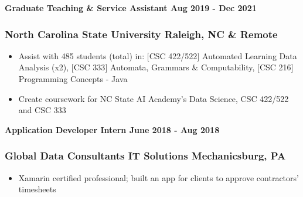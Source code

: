 \vspace{-4pt}

\noindent\textbf{Graduate Teaching \& Service Assistant \hfill Aug 2019 - Dec 2021}
\subsubsection{North Carolina State University \hfill Raleigh, NC \& Remote}
\vspace{-2pt}
\begin{itemize}
\setlength\itemsep{-0.5em}
	\item Assist with 485 students (total) in: {\footnotesize $[$CSC 422/522$]$} Automated Learning Data Analysis (x2), {\footnotesize $[$CSC 333$]$} Automata, Grammars \& Computability, {\footnotesize $[$CSC 216$]$} Programming Concepts - Java
    \item Create coursework for NC State AI Academy's Data Science, CSC 422/522 and CSC 333
\end{itemize}

\vspace{-4pt}

\noindent\textbf{Application Developer Intern \hfill June 2018 - Aug 2018}
\subsubsection{Global Data Consultants IT Solutions \hfill Mechanicsburg, PA}
\vspace{-2pt}
\begin{itemize}
\setlength\itemsep{-0.5em}
	\item Xamarin certified professional; built an app for clients to approve contractors' timesheets
\end{itemize}